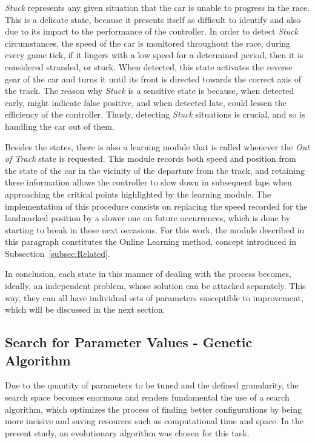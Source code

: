	\emph{Stuck} represents any given situation that the car is unable to progress in the race. This is a delicate
	state, because it presents itself as difficult to identify and also due to its impact to the performance of the
	controller. In order to detect \emph{Stuck} circumstances, the speed of the car is monitored throughout the race,
	during every game tick, if it lingers with a low speed for a determined period, then it is considered stranded,
	or stuck. When detected, this state activates the reverse gear of the car and turns it until its front is
	directed towards the correct axis of the track. The reason why \emph{Stuck} is a sensitive state is because, when
	detected early, might indicate false positive, and when detected late, could lessen the efficiency of the
	controller. Thusly, detecting \textit{Stuck} situations is crucial, and so is handling the car out of them.
	
	Besides the states, there is also a learning module that is called whenever the \emph{Out of Track} state is
	requested. This module records both speed and position from the state of the car in the vicinity of the departure
	from the track, and retaining these information allows the controller to slow down in subsequent laps when
	approaching the critical points highlighted by the learning module. The implementation of this procedure consists
	on replacing the speed recorded for the landmarked position by a slower one on future occurrences, which is done
	by starting to break in these next occasions. For this work, the module described in this paragraph constitutes
	the Online Learning method, concept introduced in Subsection~\ref{subsec:Related}.
	
	In conclusion, each state in this manner of dealing with the process becomes, ideally, an independent problem,
	whose solution can be attacked separately. This way, they can all have individual sets of parameters susceptible
	to improvement, which will be discussed in the next section.
	
\subsection{Search for Parameter Values - Genetic Algorithm} \label{subsec:GA}
	
	Due to the quantity of parameters to be tuned and the defined granularity, the search space becomes enormous and
	renders fundamental the use of a search algorithm, which optimizes the process of finding better configurations
	by being more incisive and saving resources such as computational time and space. In the present study, an
	evolutionary algorithm was chosen for this task.
	
